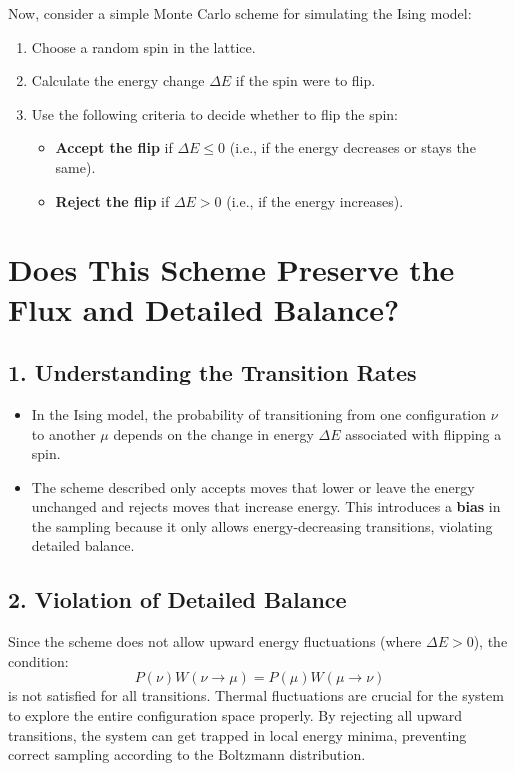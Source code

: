 \documentclass[ansiapaper]{report}
\begin{document}
\begin{multicols}{3}
Now, consider a simple Monte Carlo scheme for simulating the Ising model:
\begin{enumerate}
    \item Choose a random spin in the lattice.
    \item Calculate the energy change \( \Delta E \) if the spin were to flip.
    \item Use the following criteria to decide whether to flip the spin:
    \begin{itemize}
        \item \textbf{Accept the flip} if \( \Delta E \leq 0 \) (i.e., if the energy decreases or stays the same).
        \item \textbf{Reject the flip} if \( \Delta E > 0 \) (i.e., if the energy increases).
    \end{itemize}
\end{enumerate}

\section*{Does This Scheme Preserve the Flux and Detailed Balance?}

\subsection*{1. Understanding the Transition Rates}

\begin{itemize}
    \item In the Ising model, the probability of transitioning from one configuration \( \nu \) to another \( \mu \) depends on the change in energy \( \Delta E \) associated with flipping a spin.
    \item The scheme described only accepts moves that lower or leave the energy unchanged and rejects moves that increase energy. This introduces a \textbf{bias} in the sampling because it only allows energy-decreasing transitions, violating detailed balance.
\end{itemize}

\subsection*{2. Violation of Detailed Balance}

Since the scheme does not allow upward energy fluctuations (where \( \Delta E > 0 \)), the condition:
\[
P(\nu) W(\nu \to \mu) = P(\mu) W(\mu \to \nu)
\]
is not satisfied for all transitions. Thermal fluctuations are crucial for the system to explore the entire configuration space properly. By rejecting all upward transitions, the system can get trapped in local energy minima, preventing correct sampling according to the Boltzmann distribution.


\end{multicols}
\end{document}
